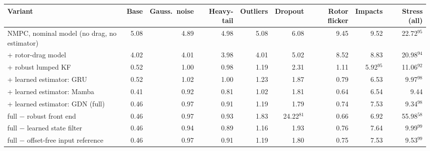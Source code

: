 \begin{tabular}{l rrrrrrrr}
\toprule
Variant & Base & Gauss.\ noise & Heavy-tail & Outliers & Dropout & Rotor flicker & Impacts & Stress (all) \\
\midrule
NMPC, nominal model (no drag, no estimator) & 5.08 & 4.89 & 4.98 & 5.08 & 6.08 & 9.45 & 9.52 & 22.72$^{95}$ \\
\quad + rotor-drag model & 4.02 & 4.01 & 3.98 & 4.01 & 5.02 & 8.52 & 8.83 & 20.98$^{94}$ \\
\quad + robust lumped KF & 0.52 & 1.00 & 0.98 & 1.19 & 2.31 & 1.11 & 5.92$^{95}$ & 11.06$^{92}$ \\
\quad + learned estimator: GRU & 0.52 & 1.02 & 1.00 & 1.23 & 1.87 & 0.79 & 6.53 & 9.97$^{98}$ \\
\quad + learned estimator: Mamba & 0.41 & 0.92 & 0.81 & 1.02 & 1.81 & 0.64 & 6.54 & 9.44 \\
\quad + learned estimator: GDN (full) & 0.46 & 0.97 & 0.91 & 1.19 & 1.79 & 0.74 & 7.53 & 9.34$^{98}$ \\
\midrule
full $-$ robust front end & 0.46 & 0.97 & 0.93 & 1.83 & 24.22$^{81}$ & 0.66 & 6.92 & 55.98$^{58}$ \\
full $-$ learned state filter & 0.46 & 0.94 & 0.89 & 1.16 & 1.93 & 0.76 & 7.64 & 9.99$^{99}$ \\
full $-$ offset-free input reference & 0.46 & 0.97 & 0.91 & 1.19 & 1.80 & 0.75 & 7.53 & 9.53$^{99}$ \\
\bottomrule
\end{tabular}

